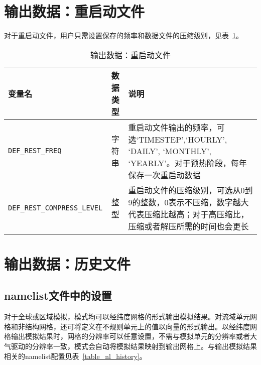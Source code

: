 \section{输出数据：重启动文件}\label{restart}
对于重启动文件，用户只需设置保存的频率和数据文件的压缩级别，见表~\ref{table_nl_restart}。
\begin{table}[!htbp] \small
\caption{输出数据：重启动文件}\label{table_nl_restart}
\centering \renewcommand{\arraystretch}{1.2}
\begin{tabular}{lcp{}}
\toprule
\textbf{变量名} & \textbf{数据类型} & \textbf{说明} \\\midrule
\texttt{DEF\_REST\_FREQ} & 字符串 & 重启动文件输出的频率，可选`TIMESTEP',`HOURLY', `DAILY', `MONTHLY', `YEARLY'。对于预热阶段，每年保存一次重启动数据 \\
\texttt{DEF\_REST\_COMPRESS\_LEVEL} & 整型 & 重启动文件的压缩级别，可选从0到9的整数，0表示不压缩，数字越大代表压缩比越高；对于高压缩比，压缩或者解压所需的时间也会更长 \\
\bottomrule
\end{tabular}
\end{table}

\section{输出数据：历史文件}\label{history}

\subsection{namelist文件中的设置}

对于全球或区域模拟，模式均可以经纬度网格的形式输出模拟结果。对流域单元网格和非结构网格，还可将定义在不规则单元上的值以向量的形式输出。以经纬度网格输出模拟结果时，网格的分辨率可以任意设置，不需与模拟单元的分辨率或者大气驱动的分辨率一致，模式会自动将模拟结果映射到输出网格上。与输出模拟结果相关的namelist配置见表~\ref{table_nl_history}。

